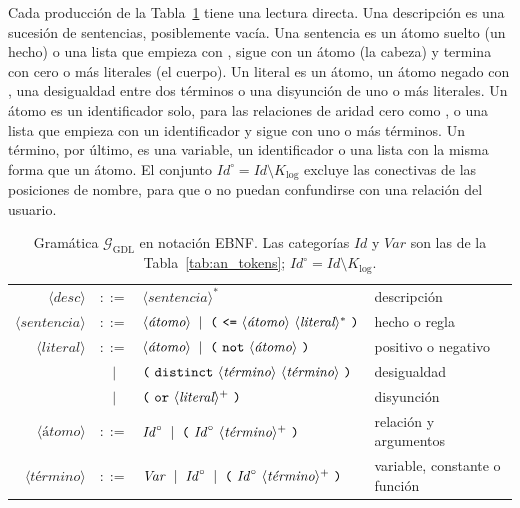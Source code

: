 Cada producción de la Tabla~\ref{tab:an_gramatica} tiene una lectura directa. Una descripción es una sucesión de sentencias, posiblemente vacía. Una sentencia es un átomo suelto (un hecho) o una lista que empieza con \kw{<=}, sigue con un átomo (la cabeza) y termina con cero o más literales (el cuerpo). Un literal es un átomo, un átomo negado con , una desigualdad  entre dos términos o una disyunción  de uno o más literales. Un átomo es un identificador solo, para las relaciones de aridad cero como , o una lista que empieza con un identificador y sigue con uno o más términos. Un término, por último, es una variable, un identificador o una lista con la misma forma que un átomo. El conjunto $\mathit{Id}^\circ = \mathit{Id} \setminus K_{\mathrm{log}}$ excluye las conectivas de las posiciones de nombre, para que  o \kw{<=} no puedan confundirse con una relación del usuario.

\begin{table}[htbp]
\centering
\small
\caption{Gramática $\mathcal G_{\mathrm{GDL}}$ en notación EBNF. Las categorías $\mathit{Id}$ y $\mathit{Var}$ son las de la Tabla~\ref{tab:an_tokens}; $\mathit{Id}^\circ = \mathit{Id} \setminus K_{\mathrm{log}}$.}
\label{tab:an_gramatica}
\renewcommand{\arraystretch}{1.25}
\begin{tabular}{@{}r@{\;}c@{\;}l l@{}}
\toprule
$\langle\textit{desc}\rangle$ & $::=$ & $\langle\textit{sentencia}\rangle^*$ & descripción \\
$\langle\textit{sentencia}\rangle$ & $::=$ & $\langle\textit{átomo}\rangle \;\mid\; \kw{(}\ \kw{<=}\ \langle\textit{átomo}\rangle\ \langle\textit{literal}\rangle^*\ \kw{)}$ & hecho o regla \\
$\langle\textit{literal}\rangle$ & $::=$ & $\langle\textit{átomo}\rangle \;\mid\; \kw{(}\ \kw{not}\ \langle\textit{átomo}\rangle\ \kw{)}$ & positivo o negativo \\
 & $\mid$ & $\kw{(}\ \kw{distinct}\ \langle\textit{término}\rangle\ \langle\textit{término}\rangle\ \kw{)}$ & desigualdad \\
 & $\mid$ & $\kw{(}\ \kw{or}\ \langle\textit{literal}\rangle^+\ \kw{)}$ & disyunción \\
$\langle\textit{átomo}\rangle$ & $::=$ & $\mathit{Id}^\circ \;\mid\; \kw{(}\ \mathit{Id}^\circ\ \langle\textit{término}\rangle^+\ \kw{)}$ & relación y argumentos \\
$\langle\textit{término}\rangle$ & $::=$ & $\mathit{Var} \;\mid\; \mathit{Id}^\circ \;\mid\; \kw{(}\ \mathit{Id}^\circ\ \langle\textit{término}\rangle^+\ \kw{)}$ & variable, constante o función \\
\bottomrule
\end{tabular}
\end{table}

